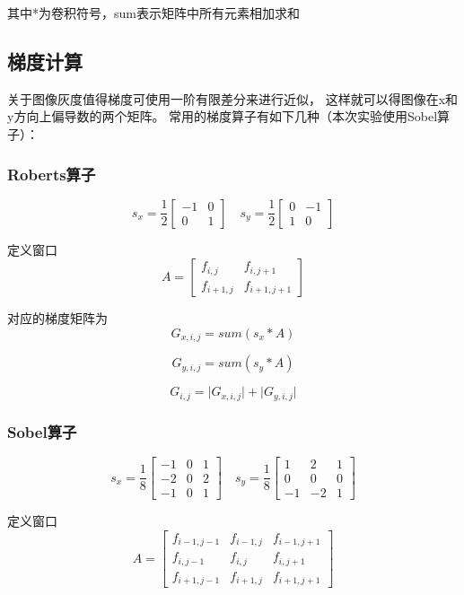 \documentclass{article}
\begin{document}
    其中*为卷积符号，sum表示矩阵中所有元素相加求和

\subsection{梯度计算}\label{operator}

    关于图像灰度值得梯度可使用一阶有限差分来进行近似，
    这样就可以得图像在x和y方向上偏导数的两个矩阵。
    常用的梯度算子有如下几种（本次实验使用Sobel算子）：

\subsubsection{Roberts算子}

\[
s_x =
\frac{1}{2}\begin{bmatrix}-1 & 0 \\ 0 & 1
\end{bmatrix}
\quad
s_y =
\frac{1}{2}\begin{bmatrix}0 & -1 \\ 1 & 0
\end{bmatrix}
\]

定义窗口\[A = \begin{bmatrix}f_{i,j} & f_{i, j + 1} \\ f_{i + 1, j} & f_{i + 1, j + 1}
\end{bmatrix}\]

对应的梯度矩阵为
\[
G_{x, i,j} = sum\left( s_x * A \right)
\]

\[G_{y, i,j} = sum\left( s_y * A \right)
\]

\[G_{i,j} = \lvert  G_{x, i,j}\rvert + \lvert G_{y, i,j}\rvert \]

\subsubsection{Sobel算子}\label{sobel}

\[
s_x =
\frac{1}{8}\begin{bmatrix}-1 & 0 & 1\\ -2 & 0 & 2 \\ -1 & 0 & 1
\end{bmatrix}
\quad
s_y =
\frac{1}{8}\begin{bmatrix}1 & 2 & 1 \\ 0 & 0 & 0 \\ -1 & -2 & 1
\end{bmatrix}
\]

定义窗口\[A = \begin{bmatrix}f_{i - 1, j - 1} & f_{i - 1, j} & f_{i - 1, j + 1} \\f_{i, j - 1} & f_{i,j} & f_{i, j + 1} \\ f_{i + 1, j - 1} & f_{i + 1, j} & f_{i + 1, j + 1}
\end{bmatrix}\]
\end{document}
